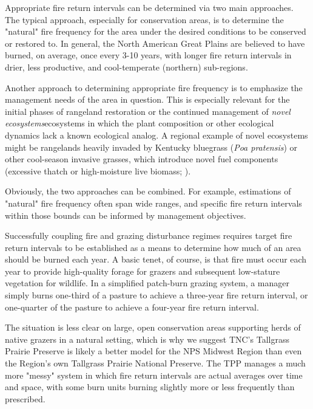 Appropriate fire return intervals can be determined via two main approaches. 
The typical approach, especially for conservation areas, is to determine the "natural" fire frequency for the area under the desired conditions to be conserved or restored to. 
In general, the North American Great Plains are believed to have burned, on average, once every 3-10 years, with longer fire return intervals in drier, less productive, and cool-temperate (northern) sub-regions. 

Another approach to determining appropriate fire frequency is to emphasize the management needs of the area in question. 
This is especially relevant for the initial phases of rangeland restoration or the continued management of \emph{novel ecosystems}\textemdash ecosystems in which the plant composition or other ecological dynamics lack a known ecological analog. 
A regional example of novel ecosystems might be rangelands heavily invaded by Kentucky bluegrass (\emph{Poa pratensis}) or other cool-season invasive grasses, which introduce novel fuel components (excessive thatch or high-moisture live biomass; \citet{toledo2014a, mcgranahan2012a}). 

Obviously, the two approaches can be combined. 
For example, estimations of "natural" fire frequency often span wide ranges, and specific fire return intervals within those bounds can be informed by management objectives. 

Successfully coupling fire and grazing disturbance regimes requires target fire return intervals to be established as a means to determine how much of an area should be burned each year. 
A basic tenet, of course, is that fire must occur each year to provide high-quality forage for grazers and subsequent low-stature vegetation for wildlife.
In a simplified patch-burn grazing system, a manager simply burns one-third of a pasture to achieve a three-year fire return interval, or one-quarter of the pasture to achieve a four-year fire return interval. 

The situation is less clear on large, open conservation areas supporting herds of native grazers in a natural setting, which is why we suggest TNC's Tallgrass Prairie Preserve is likely a better model for the NPS Midwest Region than even the Region's own Tallgrass Prairie National Preserve. 
The TPP manages a much more "messy" system in which fire return intervals are actual averages over time and space, with some burn units burning slightly more or less frequently than prescribed. 

